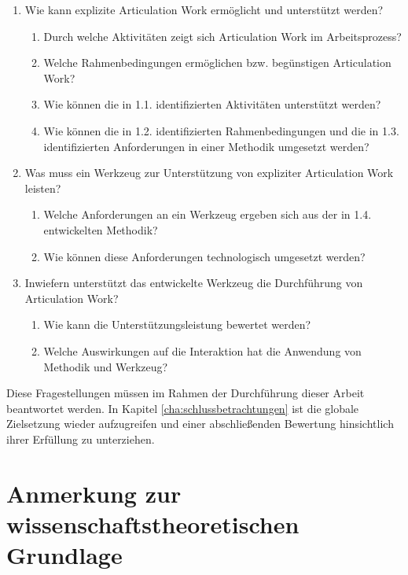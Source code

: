 \begin{enumerate}
	\item Wie kann explizite Articulation Work ermöglicht und unterstützt werden?
		\begin{enumerate}
			\item Durch welche Aktivitäten zeigt sich Articulation Work im Arbeitsprozess?
			\item Welche Rahmenbedingungen ermöglichen bzw. begünstigen Articulation Work?
			\item Wie können die in 1.1. identifizierten Aktivitäten unterstützt werden?
			\item Wie können die in 1.2. identifizierten Rahmenbedingungen und die in 1.3. identifizierten Anforderungen in einer Methodik umgesetzt werden?
		\end{enumerate}
	\item Was muss ein Werkzeug zur Unterstützung von expliziter Articulation Work leisten?
		\begin{enumerate}
			\item Welche Anforderungen an ein Werkzeug ergeben sich aus der in 1.4. entwickelten Methodik?
			\item Wie können diese Anforderungen technologisch umgesetzt werden?
		\end{enumerate}
	\item Inwiefern unterstützt das entwickelte Werkzeug die Durchführung von Articulation Work?
		\begin{enumerate}
			\item Wie kann die Unterstützungsleistung bewertet werden?
			\item Welche Auswirkungen auf die Interaktion hat die Anwendung von Methodik und Werkzeug?
		\end{enumerate}
\end{enumerate}

Diese Fragestellungen müssen im Rahmen der Durchführung dieser Arbeit beantwortet werden. In Kapitel \ref{cha:schlussbetrachtungen} ist die globale Zielsetzung wieder aufzugreifen und einer abschließenden Bewertung hinsichtlich ihrer Erfüllung zu unterziehen. 


\section{Anmerkung zur wissenschaftstheoretischen Grundlage}
\label{sec:wissenschaftstheoretische_grundlage}

